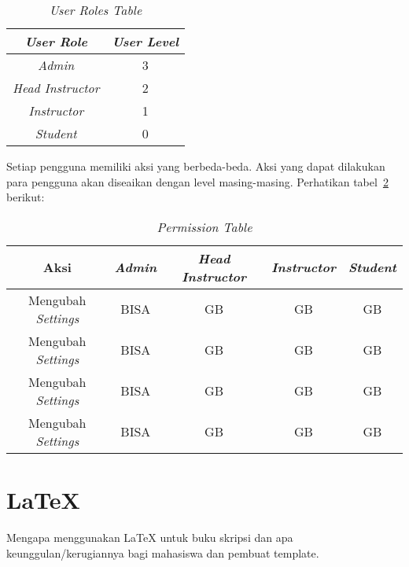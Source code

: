 \begin{table}[H] %
	\centering 
	\caption{\textit{User Roles Table}}
	\label{tab:userrole}
	\begin{tabular}{cc}
		\toprule
		\textit{User Role} & \textit{User Level} \\
		
		\midrule
		\textit{Admin} & 3 \\
		\textit{Head Instructor} & 2 \\
		\textit{Instructor} & 1 \\
		\textit{Student} & 0 \\
		
		\bottomrule
		
	\end{tabular} 
\end{table}

Setiap pengguna memiliki aksi yang berbeda-beda. Aksi yang dapat dilakukan para pengguna akan diseaikan dengan level masing-masing. Perhatikan tabel~\ref{tab:useraction} berikut:
\begin{table}[H] %
	\centering 
	\caption{\textit{Permission Table}}
	\label{tab:useraction}
	\begin{tabular}{ccccc}
		\toprule
		Aksi & \textit{Admin} & \textit{Head Instructor} & \textit{Instructor} & \textit{Student} \\
		
		\midrule
		Mengubah \textit{Settings} & BISA & GB & GB & GB \\
		Mengubah \textit{Settings} & BISA & GB & GB & GB \\
		Mengubah \textit{Settings} & BISA & GB & GB & GB \\
		Mengubah \textit{Settings} & BISA & GB & GB & GB \\
		
		\bottomrule
		
	\end{tabular} 
\end{table}

\section{\LaTeX}
\label{sec:latex}

Mengapa menggunakan \LaTeX{} untuk buku skripsi dan apa keunggulan/kerugiannya bagi mahasiswa dan pembuat template. 



